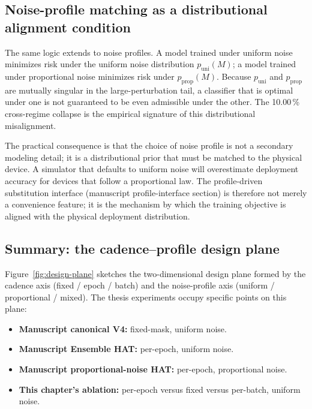 \subsection{Noise-profile matching as a distributional alignment condition}

The same logic extends to noise profiles. A model trained under uniform noise minimizes risk under the uniform noise distribution $p_{\mathrm{uni}}(M)$; a model trained under proportional noise minimizes risk under $p_{\mathrm{prop}}(M)$. Because $p_{\mathrm{uni}}$ and $p_{\mathrm{prop}}$ are mutually singular in the large-perturbation tail, a classifier that is optimal under one is not guaranteed to be even admissible under the other. The 10.00\,\% cross-regime collapse is the empirical signature of this distributional misalignment.

The practical consequence is that the choice of noise profile is not a secondary modeling detail; it is a distributional prior that must be matched to the physical device. A simulator that defaults to uniform noise will overestimate deployment accuracy for devices that follow a proportional law. The profile-driven substitution interface (manuscript profile-interface section) is therefore not merely a convenience feature; it is the mechanism by which the training objective is aligned with the physical deployment distribution.

\subsection{Summary: the cadence--profile design plane}

Figure~\ref{fig:design-plane} sketches the two-dimensional design plane formed by the cadence axis (fixed / epoch / batch) and the noise-profile axis (uniform / proportional / mixed). The thesis experiments occupy specific points on this plane:

\begin{itemize}[leftmargin=1.4em]
    \item \textbf{Manuscript canonical V4:} fixed-mask, uniform noise.
    \item \textbf{Manuscript Ensemble HAT:} per-epoch, uniform noise.
    \item \textbf{Manuscript proportional-noise HAT:} per-epoch, proportional noise.
    \item \textbf{This chapter's ablation:} per-epoch versus fixed versus per-batch, uniform noise.
\end{itemize}

